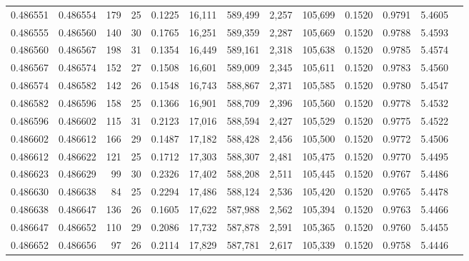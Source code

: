 \begin{tabular}{rrrrrrrrrrrrr}
0.486551 & 0.486554 & 179 &  25 &                                     0.1225 &  16,111 & 589,499 &   2,257 & 105,699 & 0.1520 & 0.9791 & 5.4605 \\
0.486555 & 0.486560 & 140 &  30 &                                     0.1765 &  16,251 & 589,359 &   2,287 & 105,669 & 0.1520 & 0.9788 & 5.4593 \\
0.486560 & 0.486567 & 198 &  31 &                                     0.1354 &  16,449 & 589,161 &   2,318 & 105,638 & 0.1520 & 0.9785 & 5.4574 \\
0.486567 & 0.486574 & 152 &  27 &                                     0.1508 &  16,601 & 589,009 &   2,345 & 105,611 & 0.1520 & 0.9783 & 5.4560 \\
0.486574 & 0.486582 & 142 &  26 &                                     0.1548 &  16,743 & 588,867 &   2,371 & 105,585 & 0.1520 & 0.9780 & 5.4547 \\
0.486582 & 0.486596 & 158 &  25 &                                     0.1366 &  16,901 & 588,709 &   2,396 & 105,560 & 0.1520 & 0.9778 & 5.4532 \\
0.486596 & 0.486602 & 115 &  31 &                                     0.2123 &  17,016 & 588,594 &   2,427 & 105,529 & 0.1520 & 0.9775 & 5.4522 \\
0.486602 & 0.486612 & 166 &  29 &                                     0.1487 &  17,182 & 588,428 &   2,456 & 105,500 & 0.1520 & 0.9772 & 5.4506 \\
0.486612 & 0.486622 & 121 &  25 &                                     0.1712 &  17,303 & 588,307 &   2,481 & 105,475 & 0.1520 & 0.9770 & 5.4495 \\
0.486623 & 0.486629 &  99 &  30 &                                     0.2326 &  17,402 & 588,208 &   2,511 & 105,445 & 0.1520 & 0.9767 & 5.4486 \\
0.486630 & 0.486638 &  84 &  25 &                                     0.2294 &  17,486 & 588,124 &   2,536 & 105,420 & 0.1520 & 0.9765 & 5.4478 \\
0.486638 & 0.486647 & 136 &  26 &                                     0.1605 &  17,622 & 587,988 &   2,562 & 105,394 & 0.1520 & 0.9763 & 5.4466 \\
0.486647 & 0.486652 & 110 &  29 &                                     0.2086 &  17,732 & 587,878 &   2,591 & 105,365 & 0.1520 & 0.9760 & 5.4455 \\
0.486652 & 0.486656 &  97 &  26 &                                     0.2114 &  17,829 & 587,781 &   2,617 & 105,339 & 0.1520 & 0.9758 & 5.4446 \\

\end{tabular}
